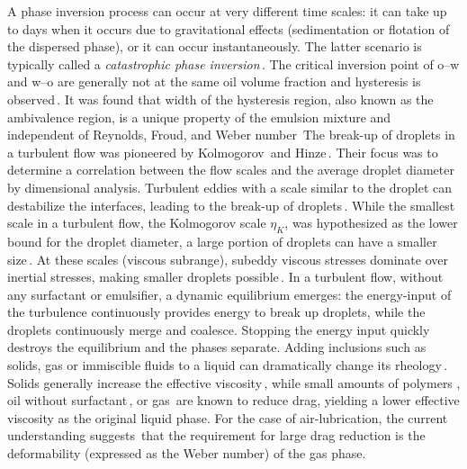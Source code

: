 A phase inversion process can occur at very different time scales: it can take up to days when it occurs due to gravitational effects (sedimentation or flotation of the dispersed phase), or it can occur instantaneously. The latter scenario is typically called a \emph{catastrophic phase inversion}\,\cite{Dickinson1981, Vaessen1996, Tyrode2005}.
The critical inversion point of o--w and w--o are generally not at the same oil volume fraction and hysteresis is observed\,\cite{Brauner2002,Yeo2002,Piela2006, Moradpour2011}.
It was found that width of the hysteresis region, also known as the ambivalence
region, is a unique property of the emulsion mixture and independent of
Reynolds, Froud, and Weber number\,\cite{Piela2009}
The break-up of droplets in a turbulent flow was pioneered by
Kolmogorov\,\cite{Kolmogorov1949} and Hinze\,\cite{Hinze1955}.
Their focus was to determine a correlation between the flow scales and the average droplet diameter by dimensional analysis.
Turbulent eddies with a scale similar to the droplet can destabilize the interfaces, leading to the break-up of droplets\,\cite{Andersson2006}.
While the smallest scale in a turbulent flow,  the Kolmogorov scale $\eta_K$, was hypothesized as the lower bound for the droplet diameter, a large portion of droplets can have a smaller size\,\cite{Zhou1998}.
At these scales (viscous subrange), subeddy viscous stresses dominate over
inertial stresses, making smaller droplets possible\,\cite{Shinnar1961,
Boxall2011}.
In a turbulent flow, without any surfactant or emulsifier, a dynamic equilibrium emerges: the energy-input of the turbulence continuously
provides energy to break up droplets, while the droplets continuously merge and coalesce. Stopping the energy input quickly destroys the equilibrium and the phases separate. 
Adding inclusions such as solids, gas or immiscible fluids to a liquid can
dramatically change its rheology\,\cite{Derkach2009, Stickel2005}. Solids generally increase the effective viscosity\,\cite{Bakhuis2018}, while
small amounts of polymers \cite{White2008}, oil without
surfactant\,\cite{Pal1993}, or gas\,\cite{vanGils2013,Verschoof2016} are known to reduce drag, yielding a lower effective viscosity as the original liquid phase.
For the case of air-lubrication, the current understanding
suggests\,\cite{Verschoof2016, vanGils2013, Spandan2018} that the requirement
for large drag reduction is the deformability (expressed as the Weber number) of
the gas phase.\\
\ifdefined\thesissections%
